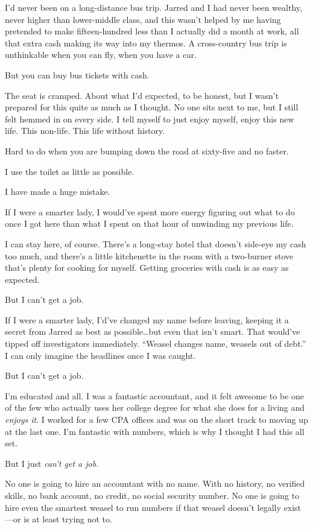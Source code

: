 I'd never been on a long-distance bus trip. Jarred and I had never been wealthy, never higher than lower-middle class, and this wasn't helped by me having pretended to make fifteen-hundred less than I actually did a month at work, all that extra cash making its way into my thermos. A cross-country bus trip is unthinkable when you can fly, when you have a car.

But you can buy bus tickets with cash.

The seat is cramped. About what I'd expected, to be honest, but I wasn't prepared for this quite as much as I thought. No one sits next to me, but I still felt hemmed in on every side. I tell myself to just enjoy myself, enjoy this new life. This non-life. This life without history.

Hard to do when you are bumping down the road at sixty-five and no faster.

I use the toilet as little as possible.

\secdiv{}

\noindent I have made a huge mistake.

If I were a smarter lady, I would've spent more energy figuring out what to do once I got here than what I spent on that hour of unwinding my previous life.

I can stay here, of course. There's a long-stay hotel that doesn't side-eye my cash too much, and there's a little kitchenette in the room with a two-burner stove that's plenty for cooking for myself. Getting groceries with cash is as easy as expected.

But I can't get a job.

If I were a smarter lady, I'd've changed my name before leaving, keeping it a secret from Jarred as best as possible\ldots{}but even that isn't smart. That would've tipped off investigators immediately. ``Weasel changes name, weasels out of debt.'' I can only imagine the headlines once I was caught.

But I can't get a job.

I'm educated and all. I was a fantastic accountant, and it felt awesome to be one of the few who actually uses her college degree for what she does for a living and \emph{enjoys it}. I worked for a few CPA offices and was on the short track to moving up at the last one. I'm fantastic with numbers, which is why I thought I had this all set.

But I just \emph{can't get a job.}

No one is going to hire an accountant with no name. With no history, no verified skills, no bank account, no credit, no social security number. No one is going to hire even the smartest weasel to run numbers if that weasel doesn't legally exist---or is at least trying not to.

